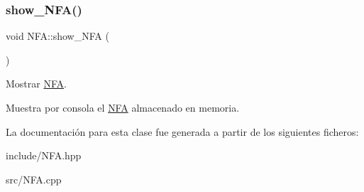\subsubsection{\texorpdfstring{show\+\_\+\+N\+F\+A()}{show\_NFA()}}
{\footnotesize\ttfamily void N\+F\+A\+::show\+\_\+\+N\+FA (\begin{DoxyParamCaption}{ }\end{DoxyParamCaption})}



Mostrar \mbox{\hyperlink{class_n_f_a}{N\+FA}}. 

Muestra por consola el \mbox{\hyperlink{class_n_f_a}{N\+FA}} almacenado en memoria. 

La documentación para esta clase fue generada a partir de los siguientes ficheros\+:\begin{DoxyCompactItemize}
\item 
include/N\+F\+A.\+hpp\item 
src/N\+F\+A.\+cpp\end{DoxyCompactItemize}
